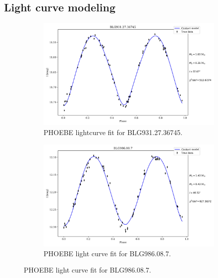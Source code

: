 \documentclass{pracalicmgr}
\begin{document}
\begin{appendices}
    \chapter{Light curve modeling}
    \begin{figure}[H]
        \centering
        \begin{adjustwidth}{-0.5in}{-0.5in}
        \begin{subfigure}{0.6\textwidth}
            \centering
            \includegraphics[width=1\textwidth]{plots/modeling_phoebe_contact_BLG931.27.36745.jpg}
            \caption{PHOEBE lightcurve fit for BLG931.27.36745. }
        \end{subfigure}
        \begin{subfigure}{0.6\textwidth}
            \centering
            \includegraphics[width=1\textwidth]{plots/modeling_phoebe_contact_BLG986.08.7.jpg}
            \caption{PHOEBE light curve fit for BLG986.08.7. }
        \end{subfigure}
        \end{adjustwidth}

\end{figure}
\end{appendices}
\end{document}

